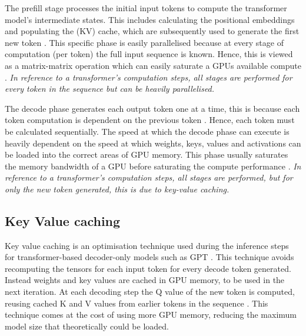 The prefill stage processes the initial input tokens to compute the transformer model's intermediate states.
This includes calculating the positional embeddings and populating the (KV) cache, which are subsequently used to generate the first new token \autocite{shengFlexGenHighThroughputGenerative2023}.
This specific phase is easily parallelised because at every stage of computation (per token) the full input sequence is known.
Hence, this is viewed as a matrix-matrix operation which can easily saturate a GPUs available compute \autocite{MasteringLLMTechniques2023}.
\textit{In reference to a transformer's computation steps, all stages are performed for every token in the sequence but can be heavily parallelised.}

The decode phase generates each output token one at a time, this is because each token computation is dependent on the previous token \autocite{shengFlexGenHighThroughputGenerative2023}.
Hence, each token must be calculated sequentially.
The speed at which the decode phase can execute is heavily dependent on the speed at which weights, keys, values and activations can be loaded into the correct areas of GPU memory.
This phase usually saturates the memory bandwidth of a GPU before saturating the compute performance \autocite{patelSplitwiseEfficientGenerative2024}.
\textit{In reference to a transformer's computation steps, all stages are performed, but for only the new token generated, this is due to key-value caching.}


\subsection{Key Value caching}
Key value caching is an optimisation technique used during the inference steps for transformer-based decoder-only models such as GPT \autocite{radfordImprovingLanguageUnderstanding}.
This technique avoids recomputing the tensors for each input token for every decode token generated. Instead weights and key values are cached in GPU memory, to be used in the next iteration.
At each decoding step the Q value of the new token is computed, reusing cached K and V values from earlier tokens in the sequence \autocite{popeEfficientlyScalingTransformer2022}.
This technique comes at the cost of using more GPU memory, reducing the maximum model size that theoretically could be loaded.


